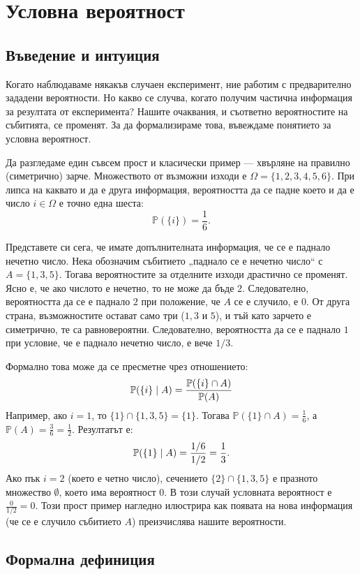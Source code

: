 \section{Условна вероятност}

\subsection{Въведение и интуиция}

Когато наблюдаваме някакъв случаен експеримент, ние работим с предварително зададени вероятности. Но какво се случва, когато получим частична информация за резултата от експеримента? Нашите очаквания, и съответно вероятностите на събитията, се променят. За да формализираме това, въвеждаме понятието за условна вероятност.

Да разгледаме един съвсем прост и класически пример — хвърляне на правилно (симетрично) зарче. Множеството от възможни изходи е $\Omega = \{1, 2, 3, 4, 5, 6\}$. При липса на каквато и да е друга информация, вероятността да се падне което и да е число $i \in \Omega$ е точно една шеста:
\[
\mathbb{P}(\{i\}) = \frac{1}{6}.
\]

Представете си сега, че имате допълнителната информация, че се е паднало нечетно число. Нека обозначим събитието „паднало се е нечетно число“ с $A = \{1, 3, 5\}$. Тогава вероятностите за отделните изходи драстично се променят. Ясно е, че ако числото е нечетно, то не може да бъде $2$. Следователно, вероятността да се е паднало $2$ при положение, че $A$ се е случило, е $0$. От друга страна, възможностите остават само три ($1, 3$ и $5$), и тъй като зарчето е симетрично, те са равновероятни. Следователно, вероятността да се е паднало $1$ при условие, че е паднало нечетно число, е вече $1/3$.

Формално това може да се пресметне чрез отношението:
\[
\mathbb{P}(\{i\} \mid A) = \frac{\mathbb{P}(\{i\} \cap A)}{\mathbb{P}(A)}
\]
Например, ако $i = 1$, то $\{1\} \cap \{1, 3, 5\} = \{1\}$. Тогава $\mathbb{P}(\{1\} \cap A) = \frac{1}{6}$, а $\mathbb{P}(A) = \frac{3}{6} = \frac{1}{2}$. Резултатът е:
\[
\mathbb{P}(\{1\} \mid A) = \frac{1/6}{1/2} = \frac{1}{3}.
\]
Ако пък $i = 2$ (което е четно число), сечението $\{2\} \cap \{1, 3, 5\}$ е празното множество $\emptyset$, което има вероятност $0$. В този случай условната вероятност е $\frac{0}{1/2} = 0$. Този прост пример нагледно илюстрира как появата на нова информация (че се е случило събитието $A$) преизчислява нашите вероятности.

\subsection{Формална дефиниция}

